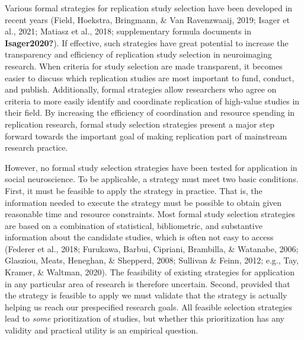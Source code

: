 \documentclass[
  man,floatsintext]{apa6}
\begin{document}
Various formal strategies for replication study selection have been developed in recent years (Field, Hoekstra, Bringmann, \& Van Ravenzwaaij, 2019; Isager et al., 2021; Matiasz et al., 2018; supplementary formula documents in \textbf{Isager2020?}). If effective, such strategies have great potential to increase the transparency and efficiency of replication study selection in neuroimaging research. When criteria for study selection are made transparent, it becomes easier to discuss which replication studies are most important to fund, conduct, and publish. Additionally, formal strategies allow researchers who agree on criteria to more easily identify and coordinate replication of high-value studies in their field. By increasing the efficiency of coordination and resource spending in replication research, formal study selection strategies present a major step forward towards the important goal of making replication part of mainstream research practice.

However, no formal study selection strategies have been tested for application in social neuroscience. To be applicable, a strategy must meet two basic conditions. First, it must be feasible to apply the strategy in practice. That is, the information needed to execute the strategy must be possible to obtain given reasonable time and resource constraints. Most formal study selection strategies are based on a combination of statistical, bibliometric, and substantive information about the candidate studies, which is often not easy to access (Federer et al., 2018; Furukawa, Barbui, Cipriani, Brambilla, \& Watanabe, 2006; Glasziou, Meats, Heneghan, \& Shepperd, 2008; Sullivan \& Feinn, 2012; e.g., Tay, Kramer, \& Waltman, 2020). The feasibility of existing strategies for application in any particular area of research is therefore uncertain. Second, provided that the strategy is feasible to apply we must validate that the strategy is actually helping us reach our prespecified research goals. All feasible selection strategies lead to \emph{some} prioritization of studies, but whether this prioritization has any validity and practical utility is an empirical question.
\end{document}

